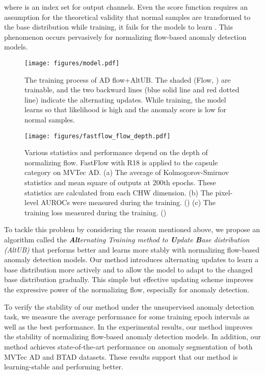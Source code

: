 \documentclass[letterpaper]{article}
\begin{document}
where  is an index set for output channels. Even the score function requires an assumption for the theoretical validity that normal samples are transformed to the base distribution while training, it fails for the models to learn . This phenomenon occurs pervasively for normalizing flow-based anomaly detection models.

\begin{figure}[t]
\centering
\texttt{[image: figures/model.pdf]}

\caption{The training process of AD flow+AltUB. The shaded (Flow, ) are trainable, and the two backward lines (blue solid line and red dotted line) indicate the alternating updates. While training, the model learns so that likelihood is high and the anomaly score is low for normal samples.}
\label{fig:2}
\end{figure}

\begin{figure*}[t]
\begin{center}
    \texttt{[image: figures/fastflow\_flow\_depth.pdf]}
\caption{Various statistics and performance depend on the depth of normalizing flow. FastFlow with R18 is applied to the capsule category on MVTec AD.
(a) The average of Kolmogorov-Smirnov statistics and mean square of outputs at 200th epochs. These statistics are calculated from each CHW dimension.
(b) The pixel-level AUROCs were measured during the training. ()
(c) The training loss measured during the training. ()
}
\label{figure-fastflow-depth}
\end{center}
\end{figure*}

To tackle this problem by considering the reason mentioned above, we propose an algorithm called the \textit{\textbf{Alt}ernating Training method to \textbf{U}pdate \textbf{B}ase distribution (AltUB)} that performs better and learns more stably with normalizing flow-based anomaly detection models. Our method introduces alternating updates to learn a base distribution more actively and to allow the model to adapt to the changed base distribution gradually. This simple but effective updating scheme improves the expressive power of the normalizing flow, especially for anomaly detection.

To verify the stability of our method under the unsupervised anomaly detection task, we measure the average performance for some training epoch intervals as well as the best performance. In the experimental results, our method improves the stability of normalizing flow-based anomaly detection models. In addition, our method achieves state-of-the-art performance on anomaly segmentation of both MVTec AD and BTAD datasets. These results support that our method is learning-stable and performing better.
\end{document}

